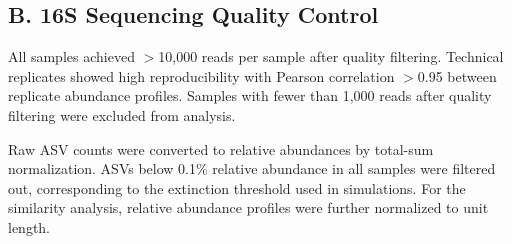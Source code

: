 \subsection*{B. 16S Sequencing Quality Control}
\label{sec:suppl:sequencing_qc}

All samples achieved $>$10,000 reads per sample after quality filtering. Technical replicates showed high reproducibility with Pearson correlation $>$0.95 between replicate abundance profiles. Samples with fewer than 1,000 reads after quality filtering were excluded from analysis.

Raw ASV counts were converted to relative abundances by total-sum normalization. ASVs below 0.1\% relative abundance in all samples were filtered out, corresponding to the extinction threshold used in simulations. For the similarity analysis, relative abundance profiles were further normalized to unit length.

